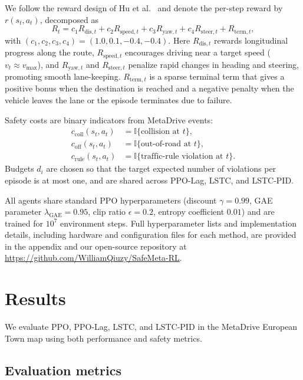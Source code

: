 \documentclass[11pt]{article}
\begin{document}
We follow the reward design of Hu et al.~\cite{hu2024lstc} and denote the per-step reward by $r(s_t,a_t)$, decomposed as
\begin{equation}
    R_t
    = c_1 R_{\text{dis},t}
    + c_2 R_{\text{speed},t}
    + c_3 R_{\text{yaw},t}
    + c_4 R_{\text{steer},t}
    + R_{\text{term},t},
    \label{eq:reward}
\end{equation}
with $(c_1,c_2,c_3,c_4)=(1.0,0.1,-0.4,-0.4)$.
Here $R_{\text{dis},t}$ rewards longitudinal progress along the route, $R_{\text{speed},t}$ encourages driving near a target speed ($v_t\approx v_{\max}$), and $R_{\text{yaw},t}$ and $R_{\text{steer},t}$ penalize rapid changes in heading and steering, promoting smooth lane-keeping.
$R_{\text{term},t}$ is a sparse terminal term that gives a positive bonus when the destination is reached and a negative penalty when the vehicle leaves the lane or the episode terminates due to failure.

Safety costs are binary indicators from MetaDrive events:
\begin{align}
    c_{\text{coll}}(s_t,a_t) &= \mathbb{I}\{\text{collision at } t\}, \\
    c_{\text{off}}(s_t,a_t) &= \mathbb{I}\{\text{out-of-road at } t\}, \\
    c_{\text{rule}}(s_t,a_t) &= \mathbb{I}\{\text{traffic-rule violation at } t\}.
\end{align}
Budgets $d_i$ are chosen so that the target expected number of violations per episode is at most one, and are shared across PPO-Lag, LSTC, and LSTC-PID.

All agents share standard PPO hyperparameters (discount $\gamma=0.99$, GAE parameter $\lambda_{\text{GAE}}=0.95$, clip ratio $\epsilon=0.2$, entropy coefficient $0.01$) and are trained for $10^7$ environment steps.
Full hyperparameter lists and implementation details, including hardware and configuration files for each method, are provided in the appendix and our open-source repository at
\url{https://github.com/WilliamQiuzy/SafeMeta-RL}.


\section{Results}

We evaluate PPO, PPO-Lag, LSTC, and LSTC-PID in the MetaDrive European Town map using both performance and safety metrics.

\subsection{Evaluation metrics}
\end{document}
